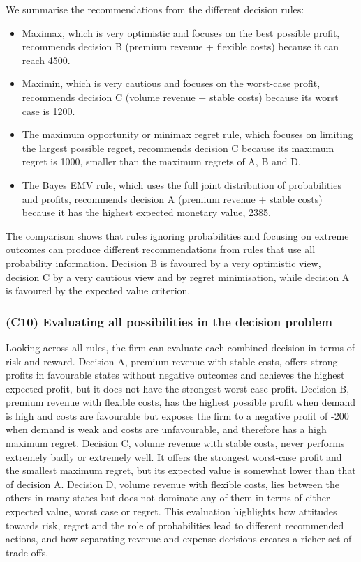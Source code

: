 We summarise the recommendations from the different decision rules:
\begin{itemize}
	\item Maximax, which is very optimistic and focuses on the best possible profit, recommends decision B (premium revenue + flexible costs) because it can reach 4500.
	\item Maximin, which is very cautious and focuses on the worst-case profit, recommends decision C (volume revenue + stable costs) because its worst case is 1200.
	\item The maximum opportunity or minimax regret rule, which focuses on limiting the largest possible regret, recommends decision C because its maximum regret is 1000, smaller than the maximum regrets of A, B and D.
	\item The Bayes EMV rule, which uses the full joint distribution of probabilities and profits, recommends decision A (premium revenue + stable costs) because it has the highest expected monetary value, 2385.
\end{itemize}
The comparison shows that rules ignoring probabilities and focusing on extreme outcomes can produce different
recommendations from rules that use all probability information. Decision B is favoured by a very optimistic view,
decision C by a very cautious view and by regret minimisation, while decision A is favoured by the expected value
criterion.

\subsubsection{(C10) Evaluating all possibilities in the decision problem}\label{subsubsec:example3-c10}

Looking across all rules, the firm can evaluate each combined decision in terms of risk and reward. Decision A, premium
revenue with stable costs, offers strong profits in favourable states without negative outcomes and achieves the highest
expected profit, but it does not have the strongest worst-case profit. Decision B, premium revenue with flexible costs, has
the highest possible profit when demand is high and costs are favourable but exposes the firm to a negative profit of -200
when demand is weak and costs are unfavourable, and therefore has a high maximum regret. Decision C, volume revenue with
stable costs, never performs extremely badly or extremely well. It offers the strongest worst-case profit and the smallest
maximum regret, but its expected value is somewhat lower than that of decision A. Decision D, volume revenue with flexible
costs, lies between the others in many states but does not dominate any of them in terms of either expected value, worst
case or regret. This evaluation highlights how attitudes towards risk, regret and the role of probabilities lead to
different recommended actions, and how separating revenue and expense decisions creates a richer set of trade-offs.

